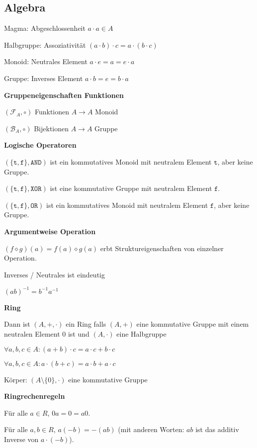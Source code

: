 \documentclass[a4paper,10pt]{article}
\begin{document}
\begin{multicols}{3}
\section{Algebra}

Magma: Abgeschlossenheit $a \cdot a \in A$

Halbgruppe: Assoziativität $(a \cdot b) \cdot c = a \cdot (b \cdot c)$

Monoid: Neutrales Element $a \cdot e = a = e \cdot a$

Gruppe: Inverses Element $a \cdot b = e = b \cdot a$

\textbf{Gruppeneigenschaften Funktionen}

$(\mathcal{F}_A,\circ)$ Funktionen $A\to A$ Monoid

$(\mathcal{B}_A,\circ)$ Bijektionen $A\to A$ Gruppe

\textbf{Logische Operatoren}

$(\{\mathtt{t},\mathtt{f}\},\mathtt{AND})$ ist ein kommutatives Monoid mit neutralem Element $\mathtt{t}$, aber keine Gruppe.

$(\{\mathtt{t},\mathtt{f}\},\mathtt{XOR})$ ist eine kommutative Gruppe mit neutralem Element $\mathtt{f}$.

$(\{\mathtt{t},\mathtt{f}\},\mathtt{OR})$ ist ein kommutatives Monoid mit neutralem Element $\mathtt{f}$, aber keine Gruppe.

\textbf{Argumentweise Operation}

$(f \diamond g) (a) = f(a) \diamond g(a)$ erbt Struktureigenschaften von einzelner Operation.

Inverses / Neutrales ist eindeutig

$(ab)^{-1} = b^{-1} a^{-1}$

\textbf{Ring}

Dann ist $(A,+,\cdot)$ ein Ring falls $(A,+)$ eine kommutative Gruppe mit einem neutralen Element $0$ ist und $(A, \cdot)$ eine Halbgruppe

$\forall a,b,c \in A: (a+b)\cdot c = a\cdot c + b \cdot c$

$\forall a,b,c \in A: a\cdot(b+c) = a\cdot b + a \cdot c$

Körper: $(A \setminus \{0\},\cdot)$ eine kommutative Gruppe

\textbf{Ringrechenregeln}

Für alle $a \in R$, $0a = 0 = a0$.

Für alle $a,b \in R$, $a(-b) = -(ab)$ (mit anderen Worten: $ab$ ist das additiv Inverse von $a \cdot (-b)$).


\end{multicols}
\end{document}
